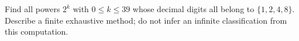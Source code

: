 Find all powers $2^k$ with $0\le k\le 39$ whose decimal digits all belong to $\{1,2,4,8\}$. Describe a finite exhaustive method; do not infer an infinite classification from this computation.
